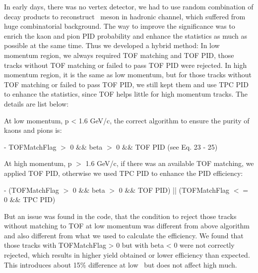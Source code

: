 In early days, there was no vertex detector, we had to use random combination of decay products to reconstruct \dzero\ meson in hadronic channel, which suffered from huge combinatorial background. The way to improve the significance was to enrich the kaon and pion PID probability and enhance the statistics as much as possible at the same time. Thus we developed a hybrid method: In low momentum region, we always required TOF matching and TOF PID, those tracks without TOF matching or failed to pass TOF PID were rejected. In high momentum region, it is the same as low momentum, but for those tracks without TOF matching or failed to pass TOF PID, we still kept them and use TPC PID to enhance the statistics, since TOF helps little for high momentum tracks. The details are list below:

At low momentum, p < 1.6 GeV/c, the correct algorithm to ensure the purity of kaons and pions is:

- TOFMatchFlag $>$ 0 $\&\&$ beta $>$ 0 $\&\&$ TOF PID (see Eq. 23 - 25)

At high momentum, p $>$ 1.6 GeV/c, if there was an available TOF matching, we applied TOF PID, otherwise we used TPC PID to enhance the PID efficiency:

- (TOFMatchFlag $>$ 0 $\&\&$ beta $>$ 0 $\&\&$ TOF PID) || (TOFMatchFlag $<=$ 0 $\&\&$ TPC PID)

But an issue was found in the code, that the condition to reject those tracks without matching to TOF at low momentum was different from above algorithm and also different from what we used to calculate the efficiency. We found that those tracks with TOFMatchFlag > 0 but with beta < 0 were not correctly rejected, which results in higher yield obtained or lower efficiency than expected. This introduces about 15\% difference at low \pt\ but does not affect high \pt much.


